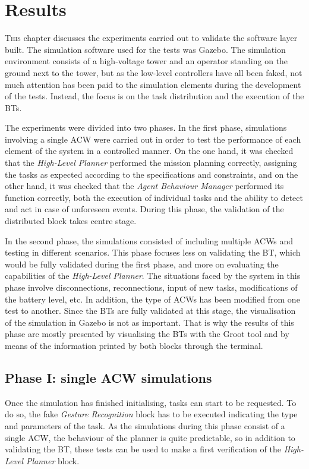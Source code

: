 \chapter{Results}
\label{ch:Results}
\lettrine[lraise=-0.1, lines=2, loversize=0.2]{T}{his} chapter discusses the experiments carried out to validate the software layer built. The simulation software used for the tests was Gazebo. The simulation environment consists of a high-voltage tower and an operator standing on the ground next to the tower, but as the low-level controllers have all been faked, not much attention has been paid to the simulation elements during the development of the tests. Instead, the focus is on the task distribution and the execution of the \glspl{BT}.

The experiments were divided into two phases. In the first phase, simulations involving a single \gls{ACW} were carried out in order to test the performance of each element of the system in a controlled manner. On the one hand, it was checked that the \emph{High-Level Planner} performed the mission planning correctly, assigning the tasks as expected according to the specifications and constraints, and on the other hand, it was checked that the \emph{Agent Behaviour Manager} performed its function correctly, both the execution of individual tasks and the ability to detect and act in case of unforeseen events. During this phase, the validation of the distributed block takes centre stage.

In the second phase, the simulations consisted of including multiple \glspl{ACW} and testing in different scenarios. This phase focuses less on validating the \gls{BT}, which would be fully validated during the first phase, and more on evaluating the capabilities of the \emph{High-Level Planner}. The situations faced by the system in this phase involve disconnections, reconnections, input of new tasks, modifications of the battery level, etc. In addition, the type of \glspl{ACW} has been modified from one test to another. Since the \glspl{BT} are fully validated at this stage, the visualisation of the simulation in Gazebo is not as important. That is why the results of this phase are mostly presented by visualising the \glspl{BT} with the Groot tool and by means of the information printed by both blocks through the terminal. 

\section{Phase I: single ACW simulations}
\label{sec:phaseI}
Once the simulation has finished initialising, tasks can start to be requested. To do so, the fake \emph{Gesture Recognition} block has to be executed indicating the type and parameters of the task. As the simulations during this phase consist of a single \gls{ACW}, the behaviour of the planner is quite predictable, so in addition to validating the \gls{BT}, these tests can be used to make a first verification of the \emph{High-Level Planner} block.

